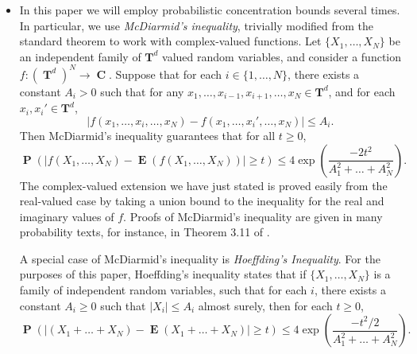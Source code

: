 \documentclass[dvipsnames,letterpaper,12pt]{article}
\numberwithin{equation}{section}
\DeclareMathOperator{\TT}{\mathbf{T}}
\DeclareMathOperator{\CC}{\mathbf{C}}
\numberwithin{theorem}{section}
\DeclareMathOperator{\EE}{\mathbf{E}}
\DeclareMathOperator{\PP}{\mathbf{P}}
\newcommand{\psitwo}[1]{\| {#1} \|_{\psi_2(L)}}
\begin{document}
\begin{itemize}
    \item In this paper we will employ probabilistic concentration bounds several times. In particular, we use \emph{McDiarmid's inequality}, trivially modified from the standard theorem to work with complex-valued functions. Let $\{ X_1, \dots, X_N \}$ be an independent family of $\mathbf{T}^d$ valued random variables, and consider a function $f: (\TT^d)^N \to \CC$. Suppose that for each $i \in \{ 1, \dots, N \}$, there exists a constant $A_i > 0$ such that for any $x_1, \dots, x_{i-1}, x_{i+1}, \dots, x_N \in \mathbf{T}^d$, and for each $x_i, x_i' \in \mathbf{T}^d$,
    \[ |f(x_1, \dots, x_i, \dots, x_N) - f(x_1, \dots, x_i', \dots, x_N)| \leq A_i. \]
    Then McDiarmid's inequality guarantees that for all $t \geq 0$,
    \[ \PP \left( |f(X_1, \dots, X_N) - \EE(f(X_1, \dots, X_N))| \geq t \right) \leq 4 \exp \left( \frac{-2t^2}{A_1^2 + \dots + A_N^2} \right). \]
    The complex-valued extension we have just stated is proved easily from the real-valued case by taking a union bound to the inequality for the real and imaginary values of $f$. Proofs of McDiarmid's inequality are given in many probability texts, for instance, in Theorem 3.11 of \cite{VanHandel}.

    A special case of McDiarmid's inequality is \emph{Hoeffding's Inequality}. For the purposes of this paper, Hoeffding's inequality states that if $\{ X_1, \dots, X_N \}$ is a family of independent random variables, such that for each $i$, there exists a constant $A_i \geq 0$ such that $|X_i| \leq A_i$ almost surely, then for each $t \geq 0$,
    \[ \PP \left( |(X_1 + \dots + X_N) - \EE(X_1 + \dots + X_N)| \geq t \right) \leq 4 \exp \left(\frac{-t^2/2}{A_1^2 + \dots + A_N^2} \right). \]

    \begin{comment}

    \item Our random construction involves a probabilistic concentration of measure argument. Define a convex function $\psi_2: [0,\infty) \to [0,\infty)$ by setting
    \[ \psi_2(t) = e^{t^2} - 1, \]
    The function $\psi_2$ induces an Orlicz norm on the family of scalar valued random variables over a probability space by setting, for each random variable $X$,
    \[ \psitwo{X} = \inf \left\{ A \in (0,\infty) : \EE(\psi_2(|X|/A)) \leq 1 \right\}. \]
    The family of random variables with $\psitwo{X} < \infty$ are known as \emph{subgaussian random variables}. Here are the important properties of subgaussian random variables which we use in this paper:
    \begin{itemize}
        \item If $\psitwo{X} \leq A$, then for each $t \geq 0$,
        \[ \PP \left( |X| \geq t \right) \leq 10 \exp \left( -t^2/10A^2 \right). \]
        Thus Subgaussian random variables have Gaussian tails.


\end{comment}
\end{itemize}
\end{document}
